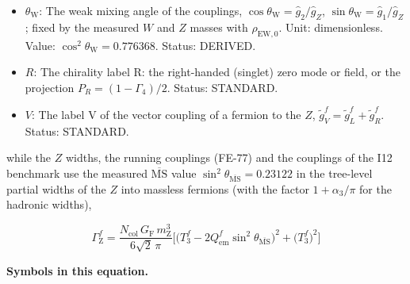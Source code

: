 \documentclass[
  10pt,
]{article}
\begin{document}
\begin{itemize}
  charge, \(Q_{\mathrm{em}} = T_3 + Y\); \(Q^f_{\mathrm{em}}\) that of
  the fermion \(f\). Unit: dimensionless. Status: STANDARD.
\item
  \(\theta_{\mathrm{W}}\): The weak mixing angle of the couplings,
  \(\cos\theta_{\mathrm{W}} = \hat g_2/\hat g_Z\),
  \(\sin\theta_{\mathrm{W}} = \hat g_1/\hat g_Z\); fixed by the measured
  \(W\) and \(Z\) masses with \(\rho_{\mathrm{EW},0}\). Unit:
  dimensionless. Value: \(\cos^2\theta_{\mathrm{W}} = 0.776368\).
  Status: DERIVED.
\item
  \(R\): The chirality label R: the right-handed (singlet) zero mode or
  field, or the projection \(P_R = (1 - \Gamma_4)/2\). Status: STANDARD.
\item
  \(V\): The label V of the vector coupling of a fermion to the \(Z\),
  \(\tilde g^f_V = \tilde g^f_L + \tilde g^f_R\). Status: STANDARD.
\end{itemize}

while the \(Z\) widths, the running couplings (FE-77) and the couplings
of the I12 benchmark use the measured \(\overline{\mathrm{MS}}\) value
\(\sin^2\theta_{\overline{\mathrm{MS}}} = 0.23122\) in the tree-level
partial widths of the \(Z\) into massless fermions (with the factor
\(1 + \alpha_3/\pi\) for the hadronic widths),

\[
\Gamma_{\mathrm{Z}}^f = \frac{N_{\mathrm{col}}\,G_{\mathrm{F}}\,m_{\mathrm{Z}}^3}{6\sqrt2\,\pi}
 \Big[\big(T_3^f - 2Q_{\mathrm{em}}^f\sin^2\theta_{\overline{\mathrm{MS}}}\big)^2 + \big(T_3^f\big)^2\Big]
\]

\textbf{Symbols in this equation.}
\end{document}
